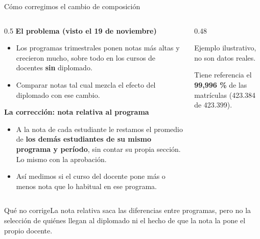 \documentclass[10pt,aspectratio=169]{beamer}
\newcommand{\sintesis}[2]{%
  \begin{block}{#1}#2\end{block}}
\begin{document}
\begin{frame}{Cómo corregimos el cambio de composición}
  \begin{columns}[T]
    \begin{column}{0.5\textwidth}\small
      \textbf{El problema (visto el 19 de noviembre)}
      \begin{itemize}
        \item Los programas trimestrales ponen notas más altas y crecieron mucho, sobre todo en los cursos de docentes \textbf{sin} diplomado.
        \item Comparar notas tal cual mezcla el efecto del diplomado con ese cambio.
      \end{itemize}
      \vspace{0.3em}
      \textbf{La corrección: nota relativa al programa}
      \begin{itemize}
        \item A la nota de cada estudiante le restamos el promedio de \textbf{los demás estudiantes de su mismo programa y período}, sin contar su propia sección. Lo mismo con la aprobación.
        \item Así medimos si el curso del docente pone más o menos nota que lo habitual en ese programa.
      \end{itemize}
    \end{column}
    \begin{column}{0.48\textwidth}
      \par
      {\scriptsize Ejemplo ilustrativo, no son datos reales.}
      \vspace{0.5em}

      {\small Tiene referencia el \textbf{99,996 \%} de las matrículas (423.384 de 423.399).}
    \end{column}
  \end{columns}
  \sintesis{Qué no corrige}{La nota relativa saca las diferencias entre programas, pero no la selección de quiénes llegan al diplomado ni el hecho de que la nota la pone el propio docente.}
\end{frame}
\end{document}

